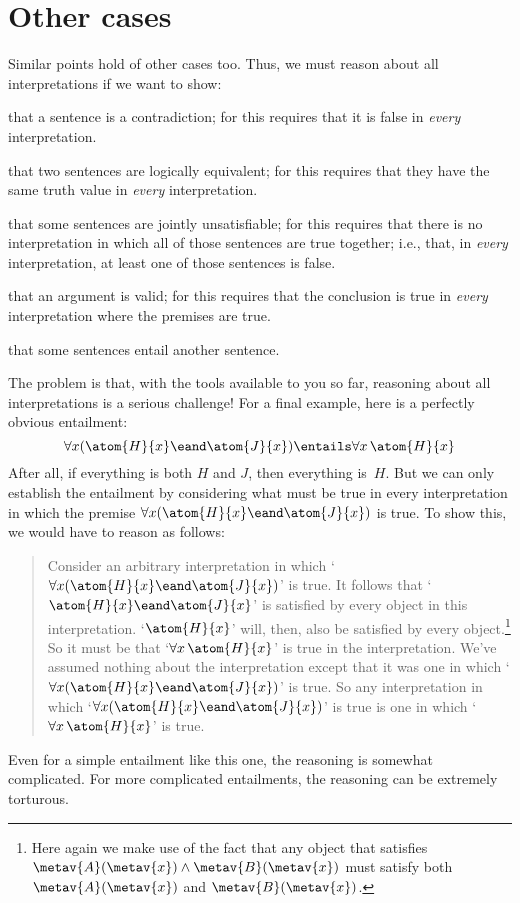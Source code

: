 \section{Other cases}
Similar points hold of other cases too. Thus, we must reason about all interpretations if we want to show:
	\begin{ebullet}
		\item that a sentence is a contradiction; for this requires that it is false in \emph{every} interpretation.
		\item that two sentences are logically equivalent; for this requires that they have the same truth value in \emph{every} interpretation.
		\item that some sentences are jointly unsatisfiable; for this requires that there is no interpretation in which all of those sentences are true together; i.e., that, in \emph{every} interpretation, at  least one of those sentences is false.
		\item that an argument is valid; for this requires that the conclusion is true in \emph{every} interpretation where the premises are true.
		\item that some sentences entail another sentence.
	\end{ebullet}
The problem is that, with the tools available to you so far, reasoning about all interpretations is a serious challenge! For a final example, here is a perfectly obvious entailment:
	$$\forall x(\atom{H}{x} \eand \atom{J}{x}) \entails \forall x\, \atom{H}{x}$$
After all, if everything is both $H$ and $J$, then everything is~$H$.
But we can only establish the entailment by considering what must be
true in every interpretation in which the premise $\forall
x(\atom{H}{x} \eand \atom{J}{x})$ is true. To show this, we would have
to reason as follows:
	\begin{quote}
		Consider an arbitrary interpretation in which `$\forall x(\atom{H}{x} \eand \atom{J}{x})$' is true. It follows that `$\atom{H}{x} \eand \atom{J}{x}$' is satisfied by every object in this interpretation. `$\atom{H}{x}$' will, then, also be satisfied by every object.\footnote{Here again we make use of the fact that any object that satisfies $\metav{A}(\metav{x}) \land \metav{B}(\metav{x})$ must satisfy both $\metav{A}(\metav{x})$ and $\metav{B}(\metav{x})$.} So it must be that `$\forall x\, \atom{H}{x}$' is true in the  interpretation. We've assumed nothing about the interpretation except that it was one in which `$\forall x(\atom{H}{x} \eand \atom{J}{x})$' is true. So any interpretation in which `$\forall x(\atom{H}{x} \eand \atom{J}{x})$' is true is one in which `$\forall x\, \atom{H}{x}$' is true.
\end{quote}
Even for a simple entailment like this one, the reasoning is somewhat complicated. For more complicated entailments, the reasoning can be extremely torturous.

